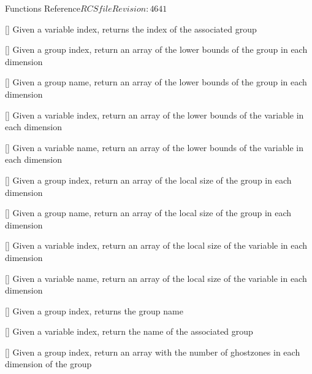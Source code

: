 \begin{cactuspart}{ Functions Reference}{$RCSfile$}{$Revision: 4641 $}
\begin{Lentry}
\item[\code{CCTK\_GroupIndexFromVarI}] [\pageref{CCTK-GroupIndexFromVarI}]
  Given a variable index, returns the index of the associated group

\item[\code{CCTK\_GrouplbndGI}] [\pageref{CCTK-GrouplbndGI}]
  Given a group index, return an array of the lower bounds
  of the group in each dimension

\item[\code{CCTK\_GrouplbndGN}] [\pageref{CCTK-GrouplbndGN}]
  Given a group name, return an array of the lower bounds
  of the group in each dimension

\item[\code{CCTK\_GrouplbndVI}] [\pageref{CCTK-GrouplbndVI}]
  Given a variable index, return an array of the lower bounds
  of the variable in each dimension

\item[\code{CCTK\_GrouplbndVN}] [\pageref{CCTK-GrouplbndVN}]
  Given a variable name, return an array of the lower bounds
  of the variable in each dimension

\item[\code{CCTK\_GrouplshGI}] [\pageref{CCTK-GrouplshGI}]
  Given a group index, return an array of the local size
  of the group in each dimension

\item[\code{CCTK\_GrouplshGN}] [\pageref{CCTK-GrouplshGN}]
  Given a group name, return an array of the local size
  of the group in each dimension

\item[\code{CCTK\_GrouplshVI}] [\pageref{CCTK-GrouplshVI}]
  Given a variable index, return an array of the local size
  of the variable in each dimension

\item[\code{CCTK\_GrouplshVN}] [\pageref{CCTK-GrouplshVN}]
  Given a variable name, return an array of the local size
  of the variable in each dimension

\item[\code{CCTK\_GroupName}] [\pageref{CCTK-GroupName}]
  Given a group index, returns the group name

\item[\code{CCTK\_GroupNameFromVarI}] [\pageref{CCTK-GroupNameFromVarI}]
  Given a variable index, return the name of the associated group

\item[\code{CCTK\_GroupnghostzonesGI}] [\pageref{CCTK-GroupnghostzonesGI}]
  Given a group index, return an array with the number of ghostzones
  in each dimension of the group


\end{Lentry}
\end{cactuspart}
